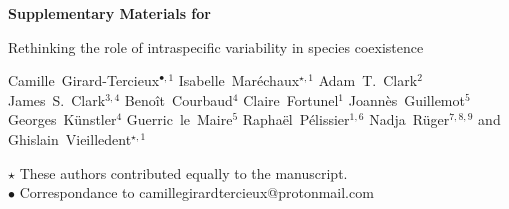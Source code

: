 
\begin{center}
  \Large{\textbf{Supplementary Materials for}}
\end{center}

\vspace{1cm}

\begin{center}
  \LARGE{Rethinking the role of intraspecific variability in species coexistence}
\end{center}

\vspace{1cm}

\begin{center}
  \large{
  Camille~Girard-Tercieux$^{\bullet, 1}$ \hspace{0.5cm} Isabelle~Maréchaux$^{\star, 1}$ \hspace{0.5cm} Adam~T.~Clark$^2$ \hspace{0.5cm} James~S.~Clark$^{3,4}$ \hspace{0.5cm} Benoît~Courbaud$^{4}$ \hspace{0.5cm} Claire~Fortunel$^{1}$ \hspace{0.5cm} Joannès~Guillemot$^{5}$ \hspace{0.5cm} Georges~Künstler$^{4}$ \hspace{0.5cm} Guerric~le~Maire$^{5}$ \hspace{0.5cm} Raphaël~Pélissier$^{1, 6}$ \hspace{0.5cm} Nadja~Rüger$^{7, 8, 9}$ \hspace{0.5cm} and Ghislain~Vieilledent$^{\star, 1}$
  }
\end{center}

\vspace{0.5cm}

\begin{center}
  $\star$ These authors contributed equally to the manuscript.\\
  $\bullet$ Correspondance to camillegirardtercieux@protonmail.com
\end{center}

\vspace{0.5cm}

